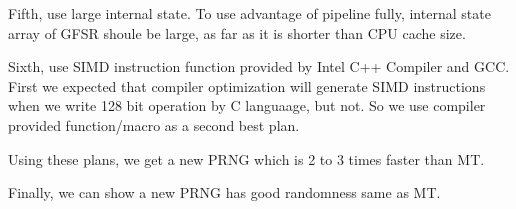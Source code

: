 \documentclass{amsart}
\theoremstyle{definition}
\begin{document}
Fifth, use large internal state. To use advantage of pipeline fully,
internal state array of GFSR shoule be large, as far as it is
shorter than CPU cache size.

Sixth, use SIMD instruction function provided by Intel C++ Compiler
and GCC. First we expected that compiler optimization will
generate SIMD instructions when we write 128 bit operation 
by C languaage, but not. So we use compiler provided function/macro
as a second best plan.

Using these plans, we get a new PRNG which is 2 to 3 times 
faster than MT.

Finally, we can show a new PRNG has good randomness same as MT.
\end{document}
